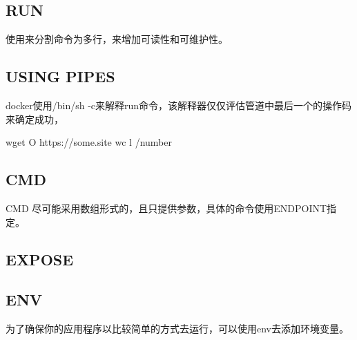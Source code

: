 \documentclass[letterpaper,10pt,english]{sphinxmanual}
\begin{document}
\subsection{RUN}
\label{\detokenize{_u8fd0_u884c_u5e94_u7528/02-dockerfile_u7f16_u5199_u6700_u4f73_u5b9e_u8df5:run}}
使用来分割命令为多行，来增加可读性和可维护性。


\subsection{USING PIPES}
\label{\detokenize{_u8fd0_u884c_u5e94_u7528/02-dockerfile_u7f16_u5199_u6700_u4f73_u5b9e_u8df5:using-pipes}}
docker使用/bin/sh -c来解释run命令，该解释器仅仅评估管道中最后一个的操作码来确定成功，

%
\begin{sphinxVerbatim}[commandchars=\\\{\}]
 wget \PYGZhy{}O \PYGZhy{} https://some.site  wc \PYGZhy{}l \PYGZgt{} /number
\end{sphinxVerbatim}


\subsection{CMD}
\label{\detokenize{_u8fd0_u884c_u5e94_u7528/02-dockerfile_u7f16_u5199_u6700_u4f73_u5b9e_u8df5:cmd}}
CMD 尽可能采用数组形式的，且只提供参数，具体的命令使用ENDPOINT指定。


\subsection{EXPOSE}
\label{\detokenize{_u8fd0_u884c_u5e94_u7528/02-dockerfile_u7f16_u5199_u6700_u4f73_u5b9e_u8df5:expose}}

\subsection{ENV}
\label{\detokenize{_u8fd0_u884c_u5e94_u7528/02-dockerfile_u7f16_u5199_u6700_u4f73_u5b9e_u8df5:env}}
为了确保你的应用程序以比较简单的方式去运行，可以使用env去添加环境变量。

%
\begin{sphinxVerbatim}[commandchars=\\\{\}]
\end{sphinxVerbatim}
\end{document}
